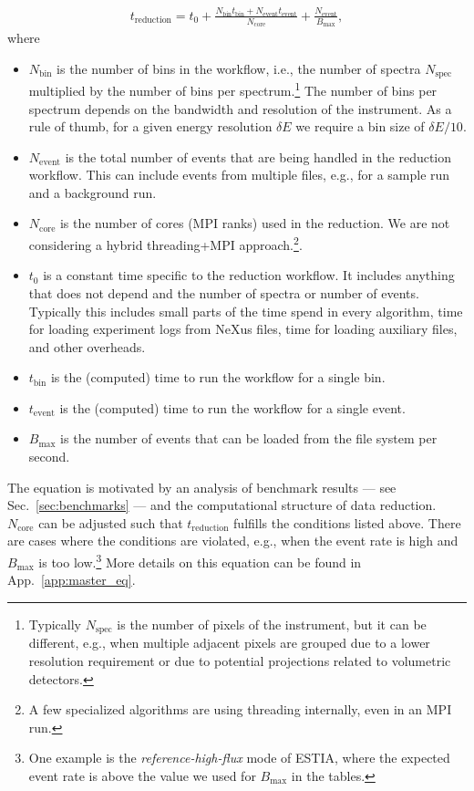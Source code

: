\documentclass[a4paper,english,numbers=noenddot,bibliography=totoc,chapterprefix=on,DIV=12]{scrartcl}
\newcommand{\Treduction}{t_{\text{reduction}}}
\newcommand{\Tbin}{t_{\text{bin}}}
\newcommand{\Tevent}{t_{\text{event}}}
\newcommand{\Nbin}{N_{\text{bin}}}
\newcommand{\Ncore}{N_{\text{core}}}
\newcommand{\Nevent}{N_{\text{event}}}
\newcommand{\Nspec}{N_{\text{spec}}}
\newcommand{\Bmax}{B_{\text{max}}}
\newcommand{\estia}{ESTIA\xspace}
\begin{document}
\begin{align}
  \Treduction = t_0 + \frac{\Nbin\Tbin + \Nevent\Tevent}{\Ncore} + \frac{\Nevent}{\Bmax},
  \label{eq:master}
\end{align}
where
\begin{itemize}
  \item $\Nbin$ is the number of bins in the workflow, i.e., the number of spectra $\Nspec$ multiplied by the number of bins per spectrum.\footnote{Typically $\Nspec$ is the number of pixels of the instrument, but it can be different, e.g., when multiple adjacent pixels are grouped due to a lower resolution requirement or due to potential projections related to volumetric detectors.}
    The number of bins per spectrum depends on the bandwidth and resolution of the instrument.
    As a rule of thumb, for a given energy resolution $\delta E$ we require a bin size of $\delta E/10$.
  \item $\Nevent$ is the total number of events that are being handled in the reduction workflow.
    This can include events from multiple files, e.g., for a sample run and a background run.
  \item $\Ncore$ is the number of cores (MPI ranks) used in the reduction.
    We are not considering a hybrid threading+MPI approach.\footnote{A few specialized algorithms are using threading internally, even in an MPI run.}.
  \item $t_0$ is a constant time specific to the reduction workflow.
    It includes anything that does not depend and the number of spectra or number of events.
    Typically this includes small parts of the time spend in every algorithm, time for loading experiment logs from NeXus files, time for loading auxiliary files, and other overheads.
  \item $\Tbin$ is the (computed) time to run the workflow for a single bin.
  \item $\Tevent$ is the (computed) time to run the workflow for a single event.
  \item $\Bmax$ is the number of events that can be loaded from the file system per second.
\end{itemize}
The equation is motivated by an analysis of benchmark results --- see Sec.~\ref{sec:benchmarks} --- and the computational structure of data reduction.
$\Ncore$ can be adjusted such that $\Treduction$ fulfills the conditions listed above.
There are cases where the conditions are violated, e.g., when the event rate is high and $\Bmax$ is too low.\footnote{One example is the \emph{reference-high-flux} mode of \estia, where the expected event rate is above the value we used for $\Bmax$ in the tables.}
More details on this equation can be found in App.~\ref{app:master_eq}.
\end{document}
